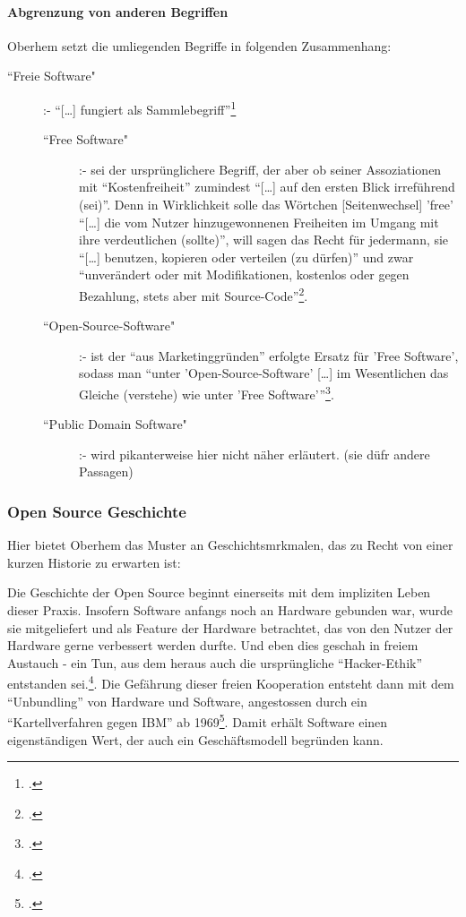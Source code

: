 \documentclass[DIV=calc,BCOR=5mm,11pt,headings=small,oneside,abstract=true, toc=bib]{scrartcl}
\begin{document}
\paragraph{Abgrenzung von anderen Begriffen}

Oberhem setzt die umliegenden Begriffe in folgenden Zusammenhang:

\begin{description}
  \item[``Freie Software"] :- \enquote{[\ldots] fungiert als
  Sammlebegriff}\footcite[vgl.][8]{Oberhem2008a}
  \begin{description}
    \item[``Free Software"] :- sei der ursprünglichere Begriff, der
    aber ob seiner Assoziationen mit \enquote{Kostenfreiheit} zumindest
    \enquote{[\ldots] auf den ersten Blick irreführend (sei)}. Denn in
    Wirklichkeit solle das Wörtchen [Seitenwechsel] 'free' \enquote{[\ldots] die
    vom Nutzer hinzugewonnenen Freiheiten im Umgang mit ihre verdeutlichen
    (sollte)}, will sagen das Recht für jedermann, sie \enquote{[\ldots]
    benutzen, kopieren oder verteilen (zu dürfen)} und zwar
    \enquote{unverändert oder mit Modifikationen, kostenlos oder gegen 
    Bezahlung, stets aber mit
    Source-Code}\footcite[vgl.][8f]{Oberhem2008a}.
    \item[``Open-Source-Software"] :- ist der \enquote{aus
    Marketinggründen} erfolgte Ersatz für 'Free Software', sodass man
    \enquote{unter 'Open-Source-Software' [\ldots] im Wesentlichen das
    Gleiche (verstehe) wie unter 'Free
    Software'}\footcite[vgl.][9]{Oberhem2008a}.
    \item[``Public Domain Software"] :- wird pikanterweise hier nicht
    näher erläutert. (sie düfr andere Passagen)
     
  \end{description}
\end{description}

\subsubsection{Open Source Geschichte}

Hier bietet Oberhem das Muster an Geschichtsmrkmalen, das zu Recht von einer
kurzen Historie zu erwarten ist:

Die Geschichte der Open Source beginnt einerseits mit dem impliziten Leben
dieser Praxis. Insofern Software anfangs noch an Hardware gebunden war, wurde
sie mitgeliefert und als Feature der Hardware betrachtet, das von den Nutzer der
Hardware gerne verbessert werden durfte. Und eben dies geschah in freiem
Austauch - ein Tun, aus dem heraus auch die ursprüngliche
\enquote{Hacker-Ethik} entstanden
sei.\footcite[vgl.][17f]{Oberhem2008a}. Die Gefährung dieser freien
Kooperation entsteht dann mit dem ``Unbundling'' von Hardware und Software,
angestossen durch ein \enquote{Kartellverfahren gegen IBM} ab
1969\footcite[vgl.][19]{Oberhem2008a}. Damit erhält Software einen
eigenständigen Wert, der auch ein Geschäftsmodell begründen kann.
\end{document}
